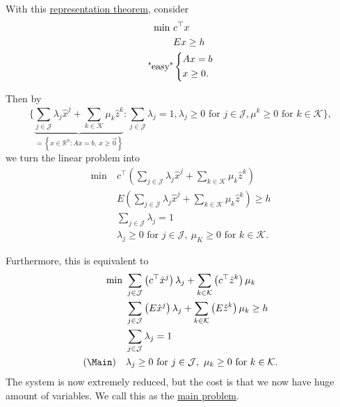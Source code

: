With this \hyperref[thm:representation]{representation theorem}, consider
\[
	\begin{aligned}
		\min~         & c^{\top}x     \\
		              & Ex\geq h      \\
		\text{"easy"} & \begin{dcases}
			                Ax = b \\
			                x\geq 0.
		                \end{dcases}
	\end{aligned}
\]

Then by
\[
	\Bigg\{\underbrace{\sum\limits_{j\in\mathcal{J}} \lambda_{j} \hat{x}^j + \sum\limits_{k\in\mathcal{K}}\mu_k \hat{z}^k}_{=\left\{x\in\mathbb{R}^n\colon Ax = b,\ x\geq \vec{0}\right\}}
	\colon \sum\limits_{j\in\mathcal{J}}\lambda_{j} = 1, \lambda_{j}\geq 0 \text{ for }j\in \mathcal{J}, \mu^k\geq 0\text{ for } k\in \mathcal{K}\Bigg\},
\]
we turn the linear problem into
\[
	\begin{aligned}
		\min~ & c^{\top}\left(\sum\limits_{j\in\mathcal{J}}\lambda_{j}\hat{x}^j + \sum\limits_{k\in\mathcal{K}}\mu_k \hat{z}^k  \right) \\
		      & E\left(\sum\limits_{j\in\mathcal{J}}\lambda_{j}\hat{x}^j + \sum\limits_{k\in\mathcal{K}}\mu_k \hat{z}^k  \right) \geq h \\
		      & \sum\limits_{j\in\mathcal{J}}\lambda_{j} = 1                                                                            \\
		      & \lambda_{j}\geq 0 \text{ for }j\in\mathcal{J},\ \mu_K\geq 0 \text{ for }k\in\mathcal{K}.
	\end{aligned}
\]

Furthermore, this is equivalent to
\[
	\begin{aligned}
		\min~        & \sum\limits_{j\in\mathcal{J}}\left(c^{\top}\hat{x}^j\right)\lambda_{j} + \sum\limits_{k\in\mathcal{K}}\left(c^{\top} \hat{z}^k  \right)\mu_k \\
		             & \sum\limits_{j\in\mathcal{J}}\left(E\hat{x}^j\right)\lambda_{j} + \sum\limits_{k\in\mathcal{K}}\left(E \hat{z}^k \right)\mu_k \geq h         \\
		             & \sum\limits_{j\in\mathcal{J}}\lambda_{j} = 1                                                                                                 \\
		(\Main)\quad & \lambda_{j}\geq 0 \text{ for }j\in\mathcal{J},\ \mu_k\geq 0 \text{ for }k\in\mathcal{K}.
	\end{aligned}
\]
The system is now extremely reduced, but the cost is that we now have huge amount of variables. We call this as the \hyperref[def:main-problem]{main problem}.

